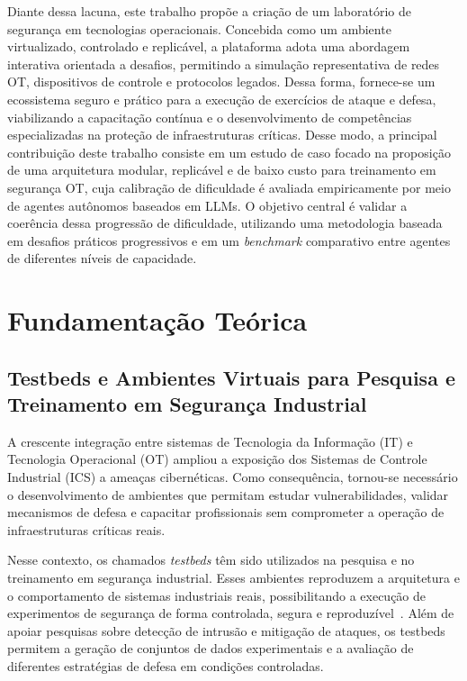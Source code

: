 \documentclass[conference]{IEEEtran}
\begin{document}
Diante dessa lacuna, este trabalho propõe a criação de um laboratório de segurança em tecnologias operacionais. Concebida como um ambiente virtualizado, controlado e replicável, a plataforma adota uma abordagem interativa orientada a desafios, permitindo a simulação representativa de redes OT, dispositivos de controle e protocolos legados. Dessa forma, fornece-se um ecossistema seguro e prático para a execução de exercícios de ataque e defesa, viabilizando a capacitação contínua e o desenvolvimento de competências especializadas na proteção de infraestruturas críticas. Desse modo, a principal contribuição deste trabalho consiste em um estudo de caso focado na proposição de uma arquitetura modular, replicável e de baixo custo para treinamento em segurança OT, cuja calibração de dificuldade é avaliada empiricamente por meio de agentes autônomos baseados em LLMs. O objetivo central é validar a coerência dessa progressão de dificuldade, utilizando uma metodologia baseada em desafios práticos progressivos e em um \textit{benchmark} comparativo entre agentes de diferentes níveis de capacidade.

\section{Fundamentação Teórica}

\subsection{Testbeds e Ambientes Virtuais para Pesquisa e Treinamento em Segurança Industrial}

A crescente integração entre sistemas de Tecnologia da Informação (IT) e Tecnologia Operacional (OT) ampliou a exposição dos Sistemas de Controle Industrial (ICS) a ameaças cibernéticas. Como consequência, tornou-se necessário o desenvolvimento de ambientes que permitam estudar vulnerabilidades, validar mecanismos de defesa e capacitar profissionais sem comprometer a operação de infraestruturas críticas reais.

Nesse contexto, os chamados \textit{testbeds} têm sido utilizados na pesquisa e no treinamento em segurança industrial. Esses ambientes reproduzem a arquitetura e o comportamento de sistemas industriais reais, possibilitando a execução de experimentos de segurança de forma controlada, segura e reproduzível~\cite{9471765}. Além de apoiar pesquisas sobre detecção de intrusão e mitigação de ataques, os testbeds permitem a geração de conjuntos de dados experimentais e a avaliação de diferentes estratégias de defesa em condições controladas.
\end{document}
